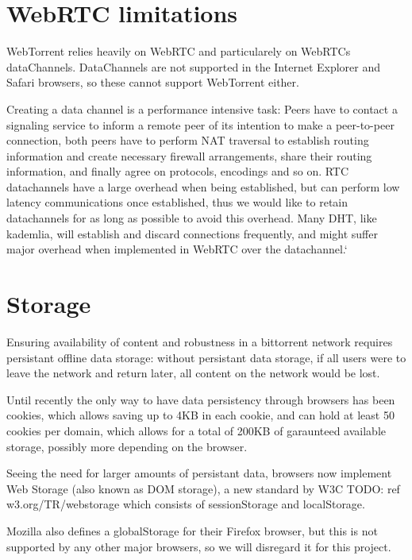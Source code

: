 \section{WebRTC limitations}
WebTorrent relies heavily on WebRTC and particularely on WebRTCs dataChannels.
DataChannels are not supported in the Internet Explorer and Safari browsers, 
so these cannot support WebTorrent either.

Creating a data channel is a performance intensive task:
Peers have to contact a signaling service to inform a remote peer of its intention
to make a peer-to-peer connection, both peers have to perform NAT traversal to establish routing information 
and create necessary firewall arrangements, share their routing information,
and finally agree on protocols, encodings and so on.
RTC datachannels have a large overhead when being established,
but can perform low latency communications once established, 
thus we would like to retain datachannels for as long as possible to avoid this overhead.
Many \acs{DHT}, like kademlia, will establish and discard connections frequently,
and might suffer major overhead when implemented in WebRTC over the datachannel.`

\section{Storage}
Ensuring availability of content and robustness in a bittorrent network requires persistant offline data storage:
without persistant data storage, if all users were to leave the network and return later, all content on the 
network would be lost.
\newline

Until recently the only way to have data persistency through browsers has been cookies, 
which allows saving up to 4KB in each cookie, and can hold at least 50 cookies per domain, 
which allows for a total of 200KB of garaunteed available storage, possibly more depending on the browser.
\newline

Seeing the need for larger amounts of persistant data, browsers now implement Web Storage 
(also known as DOM storage),
a new standard by W3C
TODO: ref w3.org/TR/webstorage 
which consists of sessionStorage and localStorage.

Mozilla also defines a globalStorage for their Firefox browser, 
but this is not supported by any other major browsers, so we will disregard it for this project.

